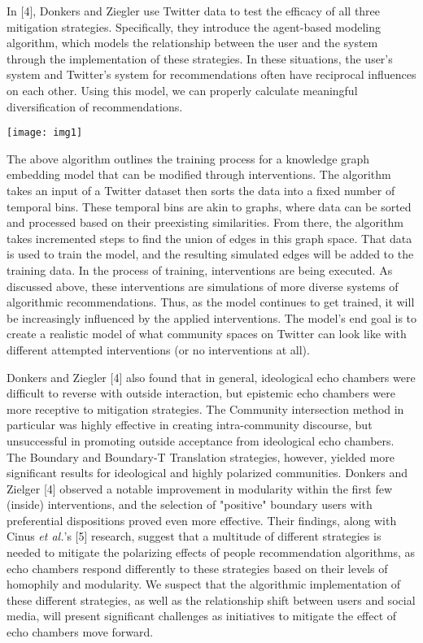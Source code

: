 \documentclass[10pt]{article}
\begin{document}
In [4], Donkers and Ziegler use Twitter data to test the efficacy of all three mitigation strategies. Specifically, they introduce the agent-based modeling algorithm, which models the relationship between the user and the system through the implementation of these strategies. In these situations, the user's system and Twitter's system for recommendations often have reciprocal influences on each other. Using this model, we can properly calculate meaningful diversification of recommendations. 

\vspace{5mm} %
\begin{center}
\noindent\texttt{[image: img1]}
\end{center}


\indent  The above algorithm outlines the training process for a knowledge graph embedding model that can be modified through interventions. The algorithm takes an input of a Twitter dataset then sorts the data into a fixed number of temporal bins. These temporal bins are akin to graphs, where data can be sorted and processed based on their preexisting similarities. From there, the algorithm takes incremented steps to find the union of edges in this graph space. That data is used to train the model, and the resulting simulated edges will be added to the training data. In the process of training, interventions are being executed. As discussed above, these interventions are simulations of more diverse systems of algorithmic recommendations. Thus, as the model continues to get trained, it will be increasingly influenced by the applied interventions. The model's end goal is to create a realistic model of what community spaces on Twitter can look like with different attempted interventions (or no interventions at all).

Donkers and Ziegler [4] also found that in general, ideological echo chambers were difficult to reverse with outside interaction, but epistemic echo chambers were more receptive to mitigation strategies. The Community intersection method in particular was highly effective in creating intra-community discourse, but unsuccessful in promoting outside acceptance from ideological echo chambers. The Boundary and Boundary-T
Translation strategies, however, yielded more significant results for ideological and highly polarized communities. Donkers and Zielger [4] observed a notable improvement in modularity within the first few (inside) interventions, and the selection of "positive" boundary users with preferential dispositions proved even more effective. Their findings, along with Cinus \textit{et al.}'s [5] research, suggest that a multitude of different strategies is needed to mitigate the polarizing effects of people recommendation algorithms, as echo chambers respond differently to these strategies based on their levels of homophily and modularity. We suspect that the algorithmic implementation of these different strategies, as well as the relationship shift between users and social media, will present significant challenges as initiatives to mitigate the effect of echo chambers move forward. 
\end{document}
